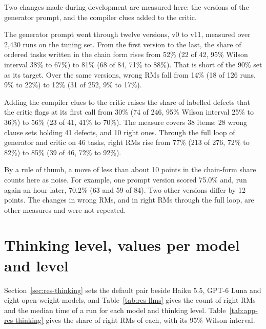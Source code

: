 \documentclass[11pt,english,listoffigures,listoftables]{tfgetsinf}
\begin{document}
Two changes made during development are measured here: the versions of the generator prompt, and the compiler clues added to the critic.

The generator prompt went through twelve versions, v0 to v11, measured over 2,430 runs on the tuning set. From the first version to the last, the share of ordered tasks written in the chain form rises from 52\% (22 of 42, 95\% Wilson interval 38\% to 67\%) to 81\% (68 of 84, 71\% to 88\%). That is short of the 90\% set as its target. Over the same versions, wrong RMs fall from 14\% (18 of 126 runs, 9\% to 22\%) to 12\% (31 of 252, 9\% to 17\%).

Adding the compiler clues to the critic raises the share of labelled defects that the critic flags at its first call from 30\% (74 of 246, 95\% Wilson interval 25\% to 36\%) to 56\% (23 of 41, 41\% to 70\%). The measure covers 38 items: 28 wrong clause sets holding 41 defects, and 10 right ones. Through the full loop of generator and critic on 46 tasks, right RMs rise from 77\% (213 of 276, 72\% to 82\%) to 85\% (39 of 46, 72\% to 92\%).

By a rule of thumb, a move of less than about 10 points in the chain-form share counts here as noise. For example, one prompt version scored 75.0\% and, run again an hour later, 70.2\% (63 and 59 of 84). Two other versions differ by 12 points. The changes in wrong RMs, and in right RMs through the full loop, are other measures and were not repeated.

\section{Thinking level, values per model and level}
\label{app:res-thinking}

Section~\ref{sec:res-thinking} sets the default pair beside Haiku 5.5, GPT-6 Luna and eight open-weight models, and Table~\ref{tab:res-llms} gives the count of right RMs and the median time of a run for each model and thinking level. Table~\ref{tab:app-res-thinking} gives the share of right RMs of each, with its 95\% Wilson interval.
\end{document}
